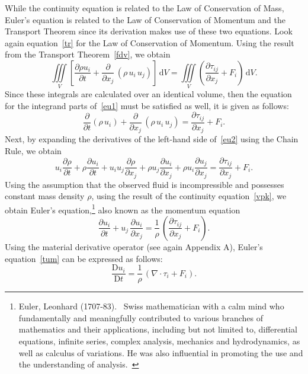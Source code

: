 \documentclass[12pt,a4paper]{report}
\begin{document}
While the continuity equation is related to the Law of Conservation of Mass, Euler's equation is related to the Law of Conservation of Momentum and the Transport Theorem since its derivation makes use of these two equations.
Look again equation~\eqref{tr} for the Law of Conservation of Momentum.
Using the result from the Transport Theorem~\eqref{fdv}, we obtain
\begin{equation}
\iiint\limits_{V} \left[\frac{\partial \rho u_{i}}{\partial t} + \frac{\partial}{\partial x_{j}} \, \left(\rho \, u_{i} \,u_{j} \right) \right] \, \mathrm{d}V = 
\iiint\limits_{V} \left(\frac{\partial \tau_{ij}}{\partial x_{j}} + F_{i} \right) \, \mathrm{d}V.  		\label{eu1}
\end{equation}
Since these integrals are calculated over an identical volume, then the equation for the integrand parts of~\eqref{eu1} must be satisfied as well, it is given as follows:
\begin{equation}
\frac{\partial}{\partial t}(\rho \, u_{i}) + \frac{\partial}{\partial x_{j}} \, \left(\rho \, u_{i} \, u_{j} \right) = \frac{\partial \tau_{ij}}{\partial x_{j}} + F_{i}. \label{eu2}
\end{equation}
Next, by expanding the derivatives of the left-hand side of~\eqref{eu2} using the Chain Rule, we obtain
\begin{equation}
u_{i} \frac{\partial \rho}{\partial t} + \rho \frac{\partial u_{i}}{\partial t} + u_{i} u_{j} \frac{\partial \rho}{\partial x_{j}} + 
\rho u_{j} \frac{\partial u_{i}}{\partial x_{j}} + \rho u_{i} \frac{\partial u_{j}}{\partial x_{j}} = \frac{\partial \tau_{ij}}{\partial x_{j}} + F_{i}.
\end{equation}
Using the assumption that the observed fluid is incompressible and possesses constant mass density $\rho$, using the result of the continuity equation~\eqref{vpk}, we obtain Euler's equation,\footnote[1]{Euler, Leonhard (1707-83). \ Swiss mathematician with a calm mind who fundamentally and meaningfully contributed to various branches of mathematics and their applications, including but not limited to, differential equations, infinite series, complex analysis, mechanics and hydrodynamics, as well as calculus of variations. He was also influential in promoting the use and the understanding of analysis.~\cite{jrs}} also known as the momentum equation
\begin{equation}
\frac{\partial u_{i}}{\partial t} + u_{j} \, \frac{\partial u_{i}}{\partial x_{j}} = \frac{1}{\rho} \, \left(\frac{\partial \tau_{ij}}{\partial x_{j}} + F_{i} \right).  \label{tum}
\end{equation}
Using the material derivative operator (see again Appendix A), Euler's equation~\eqref{tum} can be expressed as follows:
\begin{equation}
\frac{\mathrm{D} u_{i}}{\mathrm{D}t} = \frac{1}{\rho} \, \left(\nabla \cdot \tau_{i} + F_{i} \right).
\end{equation}
\end{document}
